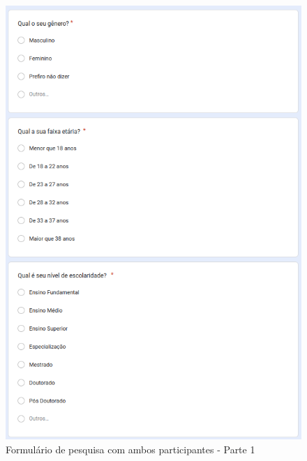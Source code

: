 \begin{figure}[!h]
	\begin{center}
	    \includegraphics[scale=0.8]{figs/Form/01.png}
	\end{center}
	\caption{\label{AP_P01}Formulário de pesquisa com ambos participantes - Parte 1}
\end{figure}

\newpage

